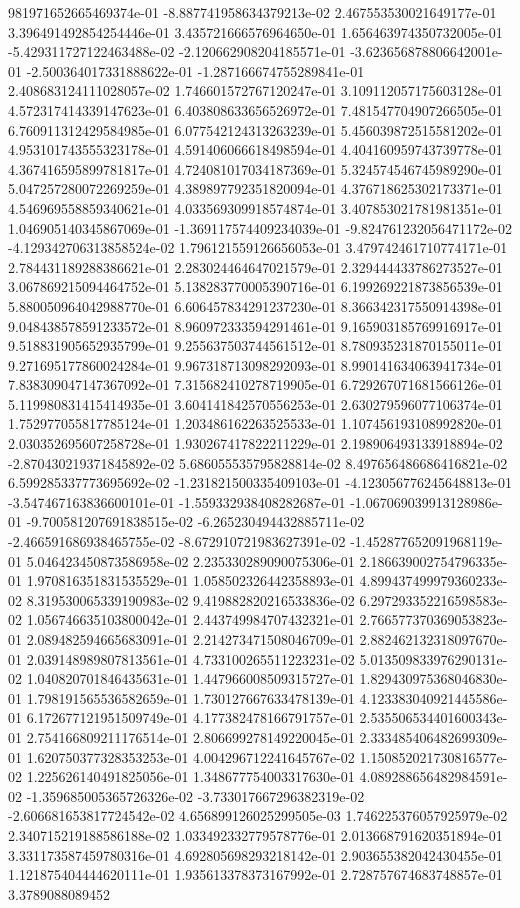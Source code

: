 981971652665469374e-01	-8.887741958634379213e-02	2.467553530021649177e-01	3.396491492854254446e-01	3.435721666576964650e-01	1.656463974350732005e-01	-5.429311727122463488e-02	-2.120662908204185571e-01	-3.623656878806642001e-01	-2.500364017331888622e-01	-1.287166674755289841e-01	2.408683124111028057e-02	1.746601572767120247e-01	3.109112057175603128e-01	4.572317414339147623e-01	6.403808633656526972e-01	7.481547704907266505e-01	6.760911312429584985e-01	6.077542124313263239e-01	5.456039872515581202e-01	4.953101743555323178e-01	4.591406066618498594e-01	4.404160959743739778e-01	4.367416595899781817e-01	4.724081017034187369e-01	5.324574546745989290e-01	5.047257280072269259e-01	4.389897792351820094e-01	4.376718625302173371e-01	4.546969558859340621e-01	4.033569309918574874e-01	3.407853021781981351e-01	1.046905140345867069e-01	-1.369117574409234039e-01	-9.824761232056471172e-02	-4.129342706313858524e-02	1.796121559126656053e-01	3.479742461710774171e-01	2.784431189288386621e-01	2.283024464647021579e-01	2.329444433786273527e-01	3.067869215094464752e-01	5.138283770005390716e-01	6.199269221873856539e-01	5.880050964042988770e-01	6.606457834291237230e-01	8.366342317550914398e-01	9.048438578591233572e-01	8.960972333594291461e-01	9.165903185769916917e-01	9.518831905652935799e-01	9.255637503744561512e-01	8.780935231870155011e-01	9.271695177860024284e-01	9.967318713098292093e-01	8.990141634063941734e-01	7.838309047147367092e-01	7.315682410278719905e-01	6.729267071681566126e-01	5.119980831415414935e-01	3.604141842570556253e-01	2.630279596077106374e-01	1.752977055817785124e-01	1.203486162263525533e-01	1.107456193108992820e-01	2.030352695607258728e-01	1.930267417822211229e-01	2.198906493133918894e-02	-2.870430219371845892e-02	5.686055535795828814e-02	8.497656486686416821e-02	6.599285337773695692e-02	-1.231821500335409103e-01	-4.123056776245648813e-01	-3.547467163836600101e-01	-1.559332938408282687e-01	-1.067069039913128986e-01	-9.700581207691838515e-02	-6.265230494432885711e-02	-2.466591686938465755e-02	-8.672910721983627391e-02	-1.452877652091968119e-01	5.046423450873586958e-02	2.235330289090075306e-01	2.186639002754796335e-01	1.970816351831535529e-01	1.058502326442358893e-01	4.899437499979360233e-02	8.319530065339190983e-02	9.419882820216533836e-02	6.297293352216598583e-02	1.056746635103800042e-01	2.443749984707432321e-01	2.766577370369053823e-01	2.089482594665683091e-01	2.214273471508046709e-01	2.882462132318097670e-01	2.039148989807813561e-01	4.733100265511223231e-02	5.013509833976290131e-02	1.040820701846435631e-01	1.447966008509315727e-01	1.829430975368046830e-01	1.798191565536582659e-01	1.730127667633478139e-01	4.123383040921445586e-01	6.172677121951509749e-01	4.177382478166791757e-01	2.535506534401600343e-01	2.754166809211176514e-01	2.806699278149220045e-01	2.333485406482699309e-01	1.620750377328353253e-01	4.004296712241645767e-02	1.150852021730816577e-02	1.225626140491825056e-01	1.348677754003317630e-01	4.089288656482984591e-02	-1.359685005365726326e-02	-3.733017667296382319e-02	-2.606681653817724542e-02	4.656899126025299505e-03	1.746225376057925979e-02	2.340715219188586188e-02	1.033492332779578776e-01	2.013668791620351894e-01	3.331173587459780316e-01	4.692805698293218142e-01	2.903655382042430455e-01	1.121875404444620111e-01	1.935613378373167992e-01	2.728757674683748857e-01	3.3789088089452